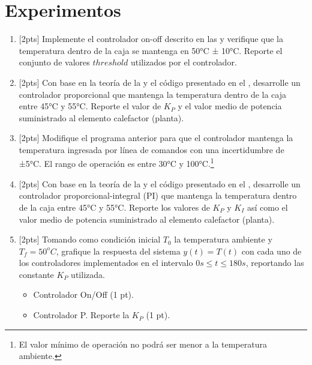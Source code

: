 %
%


\section{Experimentos}%
\label{sec:experiments}

\begin{enumerate}
	\item{} [2pts] Implemente el controlador on-off descrito en las  y verifique que la temperatura dentro de la caja se mantenga en 50°C ± 10°C.
	Reporte el conjunto de valores $threshold$ utilizados por el controlador.%
	\label{enu:ctrl-onoff}

	\item{} [2pts] Con base en la teoría de la  y el código presentado en el , desarrolle un controlador proporcional que mantenga la temperatura dentro de la caja entre 45°C y 55°C.
	Reporte el valor de $K_P$ y el valor medio de potencia suministrado al elemento calefactor (planta).

	\item{} [2pts] Modifique el programa anterior para que el controlador mantenga la temperatura ingresada por línea de comandos con una incertidumbre de ±5°C. El rango de operación es entre 30°C y 100°C.\footnote{El valor mínimo de operación no podrá ser menor a la temperatura ambiente.}%
	\label{enu:ctrl-p}

	\item{} [2pts] Con base en la teoría de la  y el código presentado en el , desarrolle un controlador proporcional-integral (PI) que mantenga la temperatura dentro de la caja entre 45°C y 55°C.
	Reporte los valores de $K_P$ y $K_I$ así como el valor medio de potencia suministrado al elemento calefactor (planta).%
	\label{enu:ctrl-pi}

	\item{} [2pts] Tomando como condición inicial $T_0$ la temperatura ambiente y $T_f = 50^{o}C$, grafique la respuesta del sistema $y(t) = T(t)$ con cada uno de los controladores implementados en el intervalo $0s \leq t \leq 180s$, reportando las constante $K_P$ utilizada.%
	\label{enu:graph}
	\begin{itemize}[nosep]
		\item Controlador On/Off (1 pt).
		\item Controlador P. Reporte la $K_P$ (1 pt).
	\end{itemize}
\end{enumerate}

